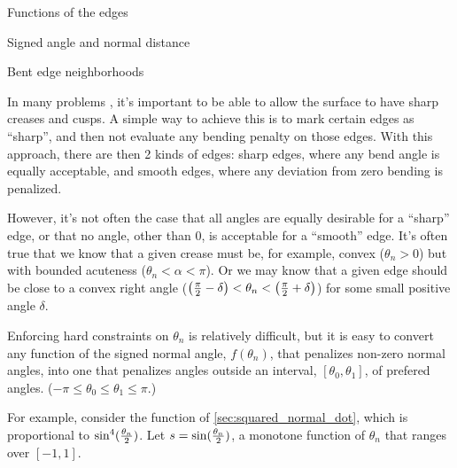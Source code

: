 \begin{plSection}{Functions of the edges}
\begin{plSection}{Signed angle and normal distance}
\end{plSection}%

\begin{plSection}{Bent edge neighborhoods}
\label{sec:Bent-edge-neighborhoods}

In many problems \cite{HoppeEtal:1994:SIGGRAPH,Hoppe:1994:Phd},
it's important to be able to allow the surface to have
sharp creases and cusps.
A simple way to achieve this is to mark
certain edges as ``sharp'',
and then not evaluate any bending penalty
on those edges.
With this approach, there are then 2 kinds of edges:
sharp edges, where any bend angle is equally acceptable,
and smooth edges, 
where any deviation from zero bending is penalized.

However, it's not often the case that all angles
are equally desirable for a ``sharp'' edge,
or that no angle, other than $0$, is acceptable
for a ``smooth'' edge.
It's often true that we know that a given crease
must be, for example, convex ($\theta_n > 0$)
but with bounded acuteness ($\theta_n < \alpha < \pi$).
Or we may know that a given edge should be close to
a convex right angle 
($\left( {\pi \over 2} - \delta \right) 
< \theta_n < 
\left( {\pi \over 2} + \delta \right)$)
for some small positive angle $\delta$.

Enforcing hard constraints on $\theta_n$
is relatively difficult,
but it is easy to convert any function
of the signed normal angle, $f(\theta_n)$,
that penalizes non-zero normal angles,
into one that penalizes angles 
outside an interval, $\left[\theta_0,\theta_1\right]$,
of prefered angles.
($-\pi \leq \theta_0 \leq \theta_1 \leq \pi$.)

For example,
consider the function of \autoref{sec:squared_normal_dot},
which is proportional to $\sin^4({\theta_n \over 2})$. 
Let $s = \sin({\theta_n \over 2})$,
a monotone function of $\theta_n$ 
that ranges over $\left[ -1, 1 \right]$.


\end{plSection}
\end{plSection}
